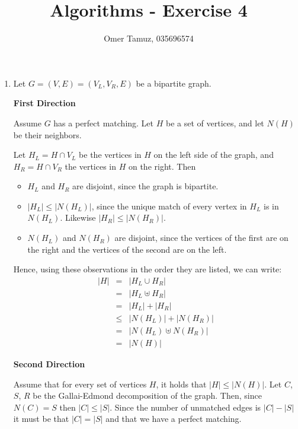 \documentclass[11pt]{article} \usepackage{amssymb}
\begin{document}
\title{Algorithms - Exercise 4}

 \author{Omer Tamuz, 035696574}
\maketitle

\begin{enumerate}


\item 
  Let $G=(V,E)=(V_L,V_R,E)$ be a bipartite graph.
  
  {\bf First Direction}
  
  Assume $G$ has a perfect matching. Let $H$ be a set of vertices, and let 
  $N(H)$ be their neighbors. 
  
  Let $H_L=H\cap V_L$ be the vertices in $H$ on the left side of the graph, 
  and $H_R=H\cap V_R$ the
  vertices in $H$ on the right. Then
  \begin{itemize}
  \item $H_L$ and $H_R$ are disjoint, since the graph is bipartite.
  \item $|H_L| \leq |N(H_L)|$, since the unique match of every vertex in $H_L$
    is in $N(H_L)$. Likewise $|H_R| \leq |N(H_R)|$.
  \item $N(H_L)$ and $N(H_R)$ are disjoint, since the vertices of the first are
    on the right and the vertices of the second are on the left. 
  \end{itemize}
  
  Hence, using these observations in the order they are listed, we can write: 
  \begin{eqnarray*}
    |H|&=&|H_L\cup H_R| 
    \\ &=& |H_L \uplus H_R| 
    \\ &=& |H_L|+|H_R| 
    \\ &\leq& |N(H_L)| + |N(H_R)|
    \\ &=& |N(H_L) \uplus N(H_R)|
    \\ &=& |N(H)|
  \end{eqnarray*}
  
  {\bf Second Direction}
  
  Assume that for every set of vertices $H$, it holds that $|H| \leq |N(H)|$. Let
  $C$, $S$, $R$ be the Gallai-Edmond decomposition of the graph. Then, since
  $N(C)=S$ then $|C| \leq |S|$. Since the number of unmatched edges is 
  $|C|-|S|$ it must be that $|C|=|S|$ and that we have a perfect matching.


\end{enumerate}
\end{document}
